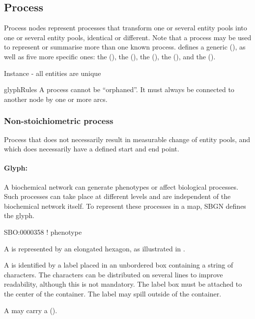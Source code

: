 \subsection{Process}\label{sec:PNs}

Process nodes represent processes that transform one or several entity
pools into one or several entity pools, identical or different. Note
that a process may be used to represent or summarise more than one
known process.  \SBGNPDLone defines a generic 
(), as well as five more specific ones: the
 (), the  (), the 
(), the  (),
and the  ().

\begin{glyphDescription}
  \begin{glyphIdentity}
    \item Instance - all entities are unique
  \end{glyphIdentity}

  \item glyphRules A process cannot be ``orphaned''. It must always
    be connected to another node by one or more arcs.
\end{glyphDescription}


\subsubsection{Non-stoichiometric process}

 Process that does not necessarily result in measurable change of entity pools, and which does necessarily have a defined start and end point. 

\paragraph{Glyph: }
\label{sec:phenotype}

A biochemical network can generate phenotypes or affect biological
processes.  Such processes can take place at different levels and are
independent of the biochemical network itself.  To represent these
processes in a map, SBGN defines the  glyph.

\begin{glyphDescription}

\glyphSboTerm SBO:0000358 ! phenotype

\glyphContainer A  is represented by an elongated
hexagon, as illustrated in .

\glyphLabel A  is identified by a label placed in an
unbordered box containing a string of characters.  The characters can be
distributed on several lines to improve readability, although this is not
mandatory.  The label box must be attached to the center of the
 container.  The label may spill outside of the container.

\glyphAux A  may carry a 
().

\end{glyphDescription}
 
